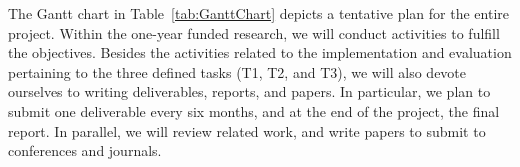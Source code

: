 
The Gantt chart in Table~\ref{tab:GanttChart} depicts a tentative plan for the entire project. Within the one-year funded research, we will conduct activities to fulfill the objectives. %
Besides the activities related to the implementation and evaluation pertaining to the three defined tasks (T1, T2, and T3), %
we will also devote ourselves to writing deliverables, reports, and %
papers. In particular, we plan to submit one deliverable every six months, and at the end of the project, %
the final report. In parallel, we will review related work, and write papers to submit to conferences and journals.




